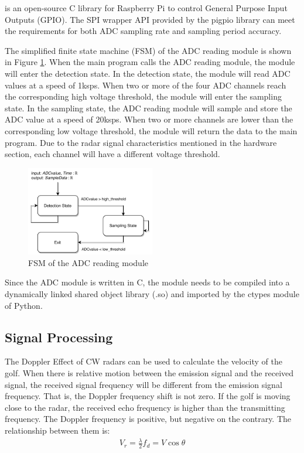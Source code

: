 \textcite{pigiop} is an open-source C library for Raspberry Pi to control General Purpose Input Outputs (GPIO). The SPI wrapper API provided by the pigpio library can meet the requirements for both ADC sampling rate and sampling period accuracy.
\par
The simplified finite state machine (FSM) of the ADC reading module is shown in Figure \ref{fig:adc_module}. When the main program calls the ADC reading module, the module will enter the detection state. In the detection state, the module will read ADC values at a speed of 1ksps. When two or more of the four ADC channels reach the corresponding high voltage threshold, the module will enter the sampling state. In the sampling state, the ADC reading module will sample and store the ADC value at a speed of 20ksps. When two or more channels are lower than the corresponding low voltage threshold, the module will return the data to the main program. Due to the radar signal characteristics mentioned in the hardware section, each channel will have a different voltage threshold.
\begin{figure}[H]
    \centering
    \includegraphics[width=0.5\textwidth]{figure/SPI.pdf}
    \caption{FSM of the ADC reading module}
    \label{fig:adc_module}
\end{figure}
Since the ADC module is written in C, the module needs to be compiled into a dynamically linked shared object library (.so) and imported by the ctypes module of Python.



\subsection{Signal Processing}
The Doppler Effect of CW radars can be used to calculate the velocity of the golf. When there is relative motion between the emission signal and the received signal, the received signal frequency will be different from the emission signal frequency. That is, the Doppler frequency shift is not zero. If the golf is moving close to the radar, the received echo frequency is higher than the transmitting frequency. The Doppler frequency is positive, but negative on the contrary. The relationship between them is: 
\begin{align}
V_{r}=\frac{\lambda}{2} f_{d}=V \cos \theta
\end{align}

